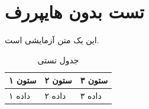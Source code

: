 \documentclass[12pt, a4paper]{article}
\begin{document}
\section{تست بدون هایپررف}
این یک متن آزمایشی است.

\begin{table}[htbp]
  \centering
  \caption{جدول تستی}
  \begin{tabular}{lll}
    \toprule
    ستون ۱ & ستون ۲ & ستون ۳ \\
    \midrule
    داده ۱ & داده ۲ & داده ۳ \\
    \bottomrule
  \end{tabular}
\end{table}
\end{document}
